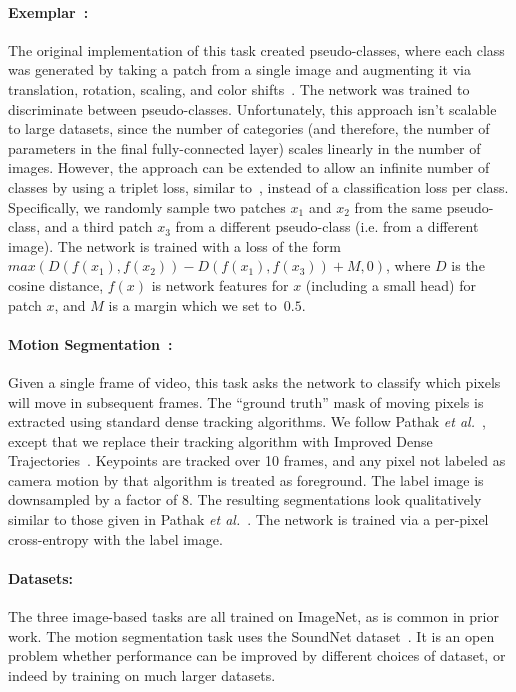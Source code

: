 \documentclass[10pt,twocolumn,letterpaper]{article}
\begin{document}
\paragraph{Exemplar~\cite{dosovitskiy2014discriminative}:} The original implementation of this task created pseudo-classes, where each class was generated by taking a patch from a single image and augmenting it via translation, rotation, scaling, and color shifts~\cite{dosovitskiy2014discriminative}.  
The network was trained to discriminate between pseudo-classes.
Unfortunately, this approach isn't scalable to large datasets, since
the number of categories (and therefore, the number of parameters in the final fully-connected layer)
scales linearly in the number of images.  
However, the approach can be extended to
allow an infinite number of classes by using a triplet loss,
similar to~\cite{wang2015unsupervised}, instead of a classification loss
per class.  Specifically, we randomly
sample two patches $x_1$ and $x_2$ from the same pseudo-class, and a third patch $x_3$ from a different pseudo-class (i.e. from a different image).  The network is trained with a loss of the form
$max(D(f(x_1),f(x_2))-D(f(x_1),f(x_3))+M,0)$, where $D$ is the cosine
distance, $f(x)$ is network features for $x$ (including a
small head) for patch $x$, and $M$ is a margin which we set to~$0.5$.


\paragraph{Motion Segmentation~\cite{pathak2016learning}:} Given a single frame of video, this task asks the network to classify which pixels will move in subsequent frames.
The ``ground truth'' mask of moving pixels is extracted using standard dense tracking algorithms.
We follow Pathak {\it et al.}~\cite{pathak2016learning}, except that we replace their tracking algorithm with Improved Dense Trajectories~\cite{wang2013action}.  
Keypoints are tracked over 10 frames, and any pixel not labeled as camera motion by that algorithm is treated as foreground.  
The label image is downsampled by a factor of 8.
The resulting segmentations look qualitatively similar to those given in Pathak {\it et al.}~\cite{pathak2016learning}.
The network is trained via a per-pixel cross-entropy with the label image.


\paragraph{Datasets:} The three image-based tasks are all trained on ImageNet, as is common
in prior work.  The motion segmentation task uses the SoundNet dataset~\cite{aytar2016soundnet}. 
It is an open problem whether performance
can be improved by different choices of dataset, or indeed by training
on much larger datasets.
\end{document}
